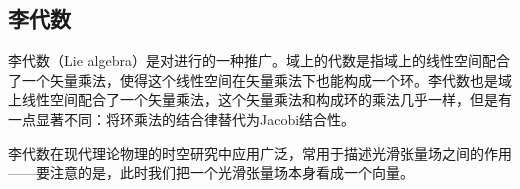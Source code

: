 

\subsection{李代数}

李代数（Lie algebra）是对进行的一种推广。域上的代数是指域上的线性空间配合了一个矢量乘法，使得这个线性空间在矢量乘法下也能构成一个环。李代数也是域上线性空间配合了一个矢量乘法，这个矢量乘法和构成环的乘法几乎一样，但是有一点显著不同：将环乘法的结合律替代为Jacobi结合性。

李代数在现代理论物理的时空研究中应用广泛，常用于描述光滑张量场之间的作用——要注意的是，此时我们把一个光滑张量场本身看成一个向量。

